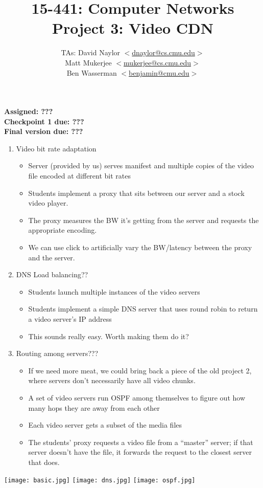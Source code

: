 \documentclass{article}
\title{	15-441: Computer Networks\\
Project 3: Video CDN\\
}
\author{TAs: David Naylor
             $<$\href{mailto:dnaylor@cs.cmu.edu}{dnaylor@cs.cmu.edu}$>$ \\
             Matt Mukerjee
             $<$\href{mailto:mukerjee@cs.cmu.edu}{mukerjee@cs.cmu.edu}$>$ \\ 
			 Ben Wasserman
             $<$\href{mailto:benjamin@cmu.edu}{benjamin@cmu.edu}$>$}
\date{}
\begin{document}
\maketitle

\large{\noindent \textbf{Assigned: ???\\
Checkpoint 1 due: ???\\
Final version due: ???}}


\begin{enumerate}

	\item Video bit rate adaptation
	\begin{itemize}
		\item Server (provided by us) serves manifest and multiple copies of the video file encoded at different bit rates
		\item Students implement a proxy that sits between our server and a stock video player.
		\item The proxy measures the BW it's getting from the server and requests the appropriate encoding.
		\item We can use click to artificially vary the BW/latency between the proxy and the server.
	\end{itemize}

	\item DNS Load balancing??
	\begin{itemize}
		\item Students launch multiple instances of the video servers
		\item Students implement a simple DNS server that uses round robin to return a video server's IP address
		\item This sounds really easy. Worth making them do it?
	\end{itemize}

	\item Routing among servers???
	\begin{itemize}
		\item If we need more meat, we could bring back a piece of the old project 2, where servers don't necessarily have all video chunks.
		\item A set of video servers run OSPF among themselves to figure out how many hops they are away from each other
		\item Each video server gets a subset of the media files
		\item The students' proxy requests a video file from a ``master'' server; if that server doesn't have the file, it forwards the request to the closest server that does.
	\end{itemize}

\end{enumerate}

\begin{center}

\texttt{[image: basic.jpg]}
\texttt{[image: dns.jpg]}
\texttt{[image: ospf.jpg]}

\end{center}
\end{document}

